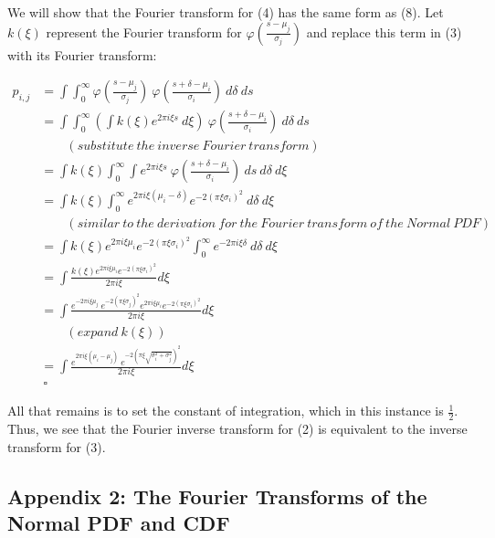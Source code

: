 \documentclass[]{article}
\begin{document}
We will show that the Fourier transform for (4) has the same form as
(8). Let \(k(\xi)\) represent the Fourier transform for
\(\varphi (\frac{s - \mu_j}{\sigma_j})\) and replace this term in (3)
with its Fourier transform:

\begin{align*}
p_{i,j} &= \int \int_0^{\infty} \varphi(\frac{s - \mu_j}{\sigma_j})\ \varphi (\frac{s + \delta - \mu_i}{\sigma_i})\ d\delta\ ds\\
&= \int \int_0^{\infty} (\int k(\xi) e^{2 \pi i \xi s}\ d\xi)\ \varphi (\frac{s + \delta - \mu_i}{\sigma_i})\ d\delta\ ds\\
&\hspace{2em}(substitute\ the\ inverse\ Fourier\ transform)\\
&= \int k(\xi) \int_0^{\infty} \int e^{2 \pi i \xi s}\ \varphi (\frac{s + \delta - \mu_i}{\sigma_i})\ ds\ d\delta\ d\xi\\
&= \int k(\xi) \int_0^{\infty} e^{2 \pi i \xi (\mu_i - \delta)} e^{-2(\pi \xi \sigma_i)^2}\ d\delta\ d\xi \hspace{3em}\\
&\hspace{2em}(similar\ to\ the\ derivation\ for\ the\ Fourier\ transform\ of\ the\ Normal\ PDF) \\
&= \int k(\xi) e^{2 \pi i \xi \mu_i}  e^{-2(\pi \xi \sigma_i)^2}\int_0^{\infty} e^{-2 \pi i \xi \delta}\ d\delta\ d\xi\\
&= \int \frac{k(\xi) e^{2 \pi i \xi \mu_i}  e^{-2(\pi \xi \sigma_i)^2}}{2 \pi i \xi} d\xi\\
&= \int \frac{e^{-2 \pi i \xi \mu_j}\ e^{-2(\pi \xi \sigma_j)^2} e^{2 \pi i \xi \mu_i}  e^{-2(\pi \xi \sigma_i)^2}}{2 \pi i \xi} d\xi\hspace{3em}\\
&\hspace{2em}(expand\ k(\xi))\\
&= \int \frac{e^{2 \pi i \xi (\mu_i - \mu_j)}\ e^{-2(\pi \xi \sqrt{\sigma_i^2 + \sigma_j^2})^2}}{2 \pi i \xi} d\xi\\
&\ \square
\end{align*}

All that remains is to set the constant of integration, which in this
instance is \(\frac{1}{2}\). Thus, we see that the Fourier inverse
transform for (2) is equivalent to the inverse transform for (3).

\hypertarget{appendix-2-the-fourier-transforms-of-the-normal-pdf-and-cdf}{%
\subsection{Appendix 2: The Fourier Transforms of the Normal PDF and
CDF}\label{appendix-2-the-fourier-transforms-of-the-normal-pdf-and-cdf}}
\end{document}
